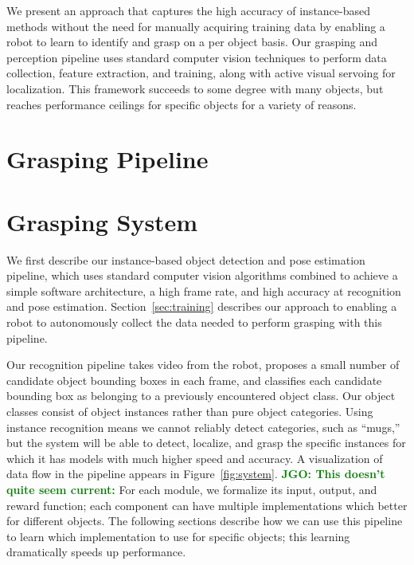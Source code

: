 \documentclass[graybox]{svmult}
\newcommand{\jgonote}[1]{\textcolor{green}{\textbf{JGO: #1}}}
\begin{document}
We present an approach that captures the high accuracy of
instance-based methods without the need for manually acquiring
training data by enabling a robot to learn to identify and grasp on a
per object basis. Our grasping and perception pipeline uses standard
computer vision techniques to perform data collection, feature
extraction, and training, along with active visual servoing for
localization.  This framework succeeds to some degree with many
objects, but reaches performance ceilings for specific objects for a
variety of reasons.



\section{Grasping Pipeline}


\section{Grasping System}

We first describe our instance-based object detection and pose
estimation pipeline, which uses standard computer vision algorithms
combined to achieve a simple software architecture, a high frame rate,
and high accuracy at recognition and pose
estimation. Section~\ref{sec:training} describes our approach to
enabling a robot to autonomously collect the data needed to perform
grasping with this pipeline.

Our recognition pipeline takes video from the robot, proposes a small
number of candidate object bounding boxes in each frame, and
classifies each candidate bounding box as belonging to a previously
encountered object class. Our object classes consist of object
instances rather than pure object categories.  Using instance
recognition means we cannot reliably detect categories, such as
``mugs,'' but the system will be able to detect, localize, and grasp
the specific instances for which it has models with much higher speed
and accuracy.  A visualization of data flow in the pipeline appears in
Figure~\ref{fig:system}.  \jgonote{This doesn't quite seem current:}
For each module, we formalize its input,
output, and reward function; each component can have multiple
implementations which better for different objects.  The following
sections describe how we can use this pipeline to learn which
implementation to use for specific objects; this learning dramatically
speeds up performance.

\end{document}
